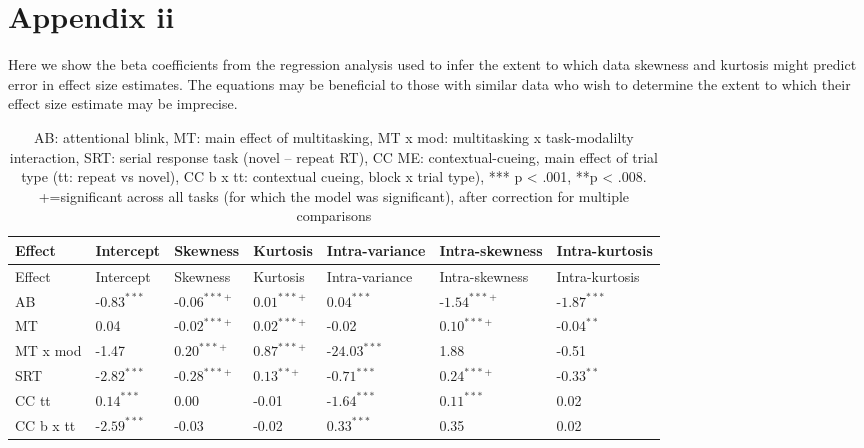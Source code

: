 \documentclass[
]{article}
\author{}
\date{\vspace{-2.5em}}
\begin{document}
\section{Appendix ii}\label{appendix-ii}

Here we show the beta coefficients from the regression analysis used to
infer the extent to which data skewness and kurtosis might predict error
in effect size estimates. The equations may be beneficial to those with
similar data who wish to determine the extent to which their effect size
estimate may be imprecise.

\begin{longtable}[]{@{}lllllll@{}}
\caption{AB: attentional blink, MT: main effect of multitasking, MT x
mod: multitasking x task-modalilty interaction, SRT: serial response
task (novel -- repeat RT), CC ME: contextual-cueing, main effect of
trial type (tt: repeat vs novel), CC b x tt: contextual cueing, block x
trial type), *** p \textless{} .001, **p \textless{} .008. +=significant
across all tasks (for which the model was significant), after correction
for multiple comparisons}\tabularnewline
\toprule\noalign{}
Effect & Intercept & Skewness & Kurtosis & Intra-variance &
Intra-skewness & Intra-kurtosis \\
\midrule\noalign{}
\endfirsthead
\toprule\noalign{}
Effect & Intercept & Skewness & Kurtosis & Intra-variance &
Intra-skewness & Intra-kurtosis \\
\midrule\noalign{}
\endhead
\bottomrule\noalign{}
\endlastfoot
AB & -\(0.83^{***}\) & -\(0.06^{***+}\) & \(0.01^{***+}\) &
\(0.04^{***}\) & -\(1.54^{***+}\) & -\(1.87^{***}\) \\
MT & 0.04 & -\(0.02^{***+}\) & \(0.02^{***+}\) & -0.02 & \(0.10^{***+}\)
& -\(0.04^{**}\) \\
MT x mod & -1.47 & \(0.20^{***+}\) & \(0.87^{***+}\) & -\(24.03^{***}\)
& 1.88 & -0.51 \\
SRT & -\(2.82^{***}\) & -\(0.28^{***+}\) & \(0.13^{**+}\) &
-\(0.71^{***}\) & \(0.24^{***+}\) & -\(0.33^{**}\) \\
CC tt & \(0.14^{***}\) & 0.00 & -0.01 & -\(1.64^{***}\) & \(0.11^{***}\)
& 0.02 \\
CC b x tt & -\(2.59^{***}\) & -0.03 & -0.02 & \(0.33^{***}\) & 0.35 &
0.02 \\
\end{longtable}
\end{document}
